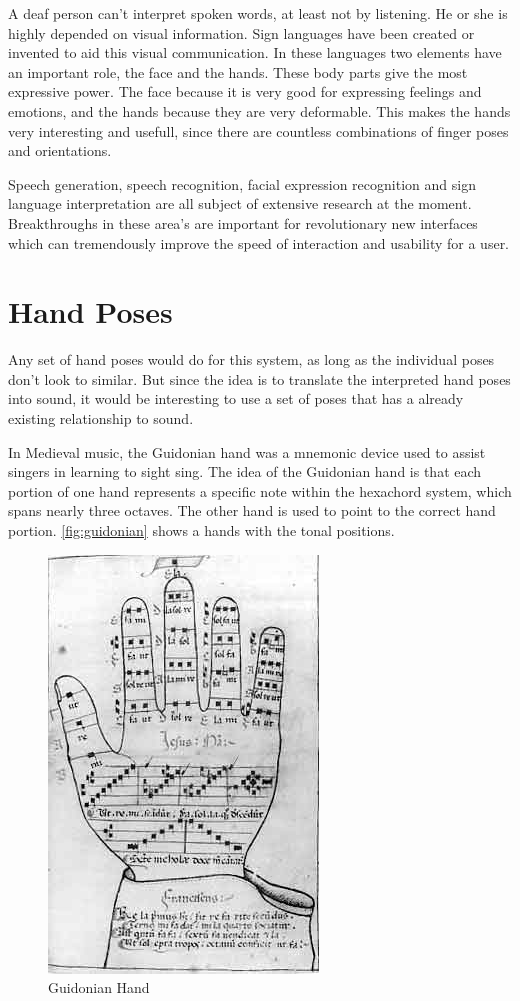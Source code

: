 A deaf person can't interpret spoken words, at least not by listening. He or she is highly depended on visual information. Sign languages have been created or invented to aid this visual communication. In these languages two elements have an important role, the face and the hands. These body parts give the most expressive power. The face because it is very good for expressing feelings and emotions, and the hands because they are very deformable. This makes the hands very interesting and usefull, since there are countless combinations of finger poses and orientations. 

Speech generation, speech recognition, facial expression recognition and sign language interpretation are all subject of extensive research at the moment. Breakthroughs in these area's are important for revolutionary new interfaces which can tremendously improve the speed of interaction and usability for a user. 

\section{Hand Poses}

Any set of hand poses would do for this system, as long as the individual poses don't look to similar. But since the idea is to translate the interpreted hand poses into sound, it would be interesting to use a set of poses that has a already existing relationship to sound.

In Medieval music, the Guidonian hand was a mnemonic device used to assist singers in learning to sight sing. The idea of the Guidonian hand is that each portion of one hand represents a specific note within the hexachord system, which spans nearly three octaves. The other hand is used to point to the correct hand portion. \autoref{fig:guidonian} shows a hands with the tonal positions.

\begin{figure}[htbp]
	\centering{}
	\includegraphics[width=0.3\linewidth]{figures/guidonian_hand.jpg}
	\caption{Guidonian Hand}
	\label{fig:guidonian}
\end{figure}

